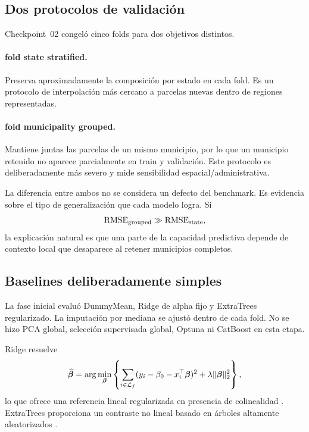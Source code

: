 \subsection{Dos protocolos de validación}

Checkpoint~02 congeló cinco folds para dos objetivos distintos.

\paragraph{fold state stratified.}
Preserva aproximadamente la composición por estado en cada fold. Es un protocolo de
interpolación más cercano a parcelas nuevas dentro de regiones representadas.

\paragraph{fold municipality grouped.}
Mantiene juntas las parcelas de un mismo municipio, por lo que un municipio retenido no
aparece parcialmente en train y validación. Este protocolo es deliberadamente más severo y
mide sensibilidad espacial/administrativa.

La diferencia entre ambos no se considera un defecto del benchmark. Es evidencia sobre el
tipo de generalización que cada modelo logra. Si
\[
\operatorname{RMSE}_{\mathrm{grouped}}\gg\operatorname{RMSE}_{\mathrm{state}},
\]
la explicación natural es que una parte de la capacidad predictiva depende de contexto local
que desaparece al retener municipios completos.

\subsection{Baselines deliberadamente simples}

La fase inicial evaluó DummyMean, Ridge de alpha fijo y ExtraTrees regularizado. La imputación
por mediana se ajustó dentro de cada fold. No se hizo PCA global, selección supervisada global,
Optuna ni CatBoost en esta etapa.

Ridge resuelve
\begin{equation}
\widehat{\bm\beta}
=
\arg\min_{\bm\beta}
\left\{
\sum_{i\in\mathcal{L}_f}
(y_i-\beta_0-x_i^\top\bm\beta)^2
+\lambda\|\bm\beta\|_2^2
\right\},
\label{eq:ridge-global}
\end{equation}
lo que ofrece una referencia lineal regularizada en presencia de colinealidad
\citep{HoerlKennard1970}. ExtraTrees proporciona un contraste no lineal basado en árboles
altamente aleatorizados \citep{Geurts2006}.

